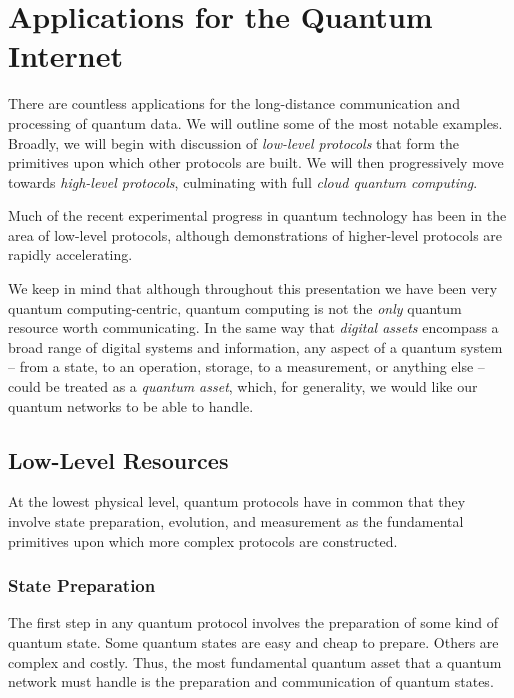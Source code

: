 \documentclass[aps,rmp,twocolumn,amsmath,amssymb,nofootinbib,superscriptaddress]{revtex4}
\begin{document}
%
%

\section{Applications for the Quantum Internet}

There are countless applications for the long-distance communication and processing of quantum data. We will outline some of the most notable examples. Broadly, we will begin with discussion of \emph{low-level protocols} that form the primitives upon which other protocols are built. We will then progressively move towards \emph{high-level protocols}, culminating with full \emph{cloud quantum computing}.

Much of the recent experimental progress in quantum technology has been in the area of low-level protocols, although demonstrations of higher-level protocols are rapidly accelerating.

We keep in mind that although throughout this presentation we have been very quantum computing-centric, quantum computing is not the \emph{only} quantum resource worth communicating. In the same way that \emph{digital assets} encompass a broad range of digital systems and information, any aspect of a quantum system -- from a state, to an operation, storage, to a measurement, or anything else -- could be treated as a \emph{quantum asset}, which, for generality, we would like our quantum networks to be able to handle.

%
%

\subsection{Low-Level Resources}

At the lowest physical level, quantum protocols have in common that they involve state preparation, evolution, and measurement as the fundamental primitives upon which more complex protocols are constructed.

%
%

\subsubsection{State Preparation}

The first step in any quantum protocol involves the preparation of some kind of quantum state. Some quantum states are easy and cheap to prepare. Others are complex and costly. Thus, the most fundamental quantum asset that a quantum network must handle is the preparation and communication of quantum states.
\end{document}
